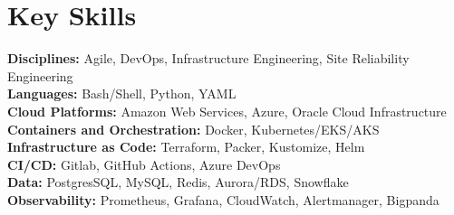 \documentclass[letterpaper,10.5pt]{article}
\makeatletter
\newcommand{\resumeItem}[1]{
  \item\small{
    {#1 \vspace{-2pt}}
  }
}
\newcommand{\resumeProjectHeading}[2]{
    \vspace{-2pt}\item
    \begin{tabular*}{0.97\textwidth}{l@{\extracolsep{\fill}}r}
      \small#1 & #2 \\
    \end{tabular*}\vspace{-7pt}
}
\newcommand{\resumeSubHeadingListStart}{\begin{itemize}[leftmargin=0.15in, label={}]}
\newcommand{\resumeSubHeadingListEnd}{\end{itemize}}
\newcommand{\resumeItemListStart}{\begin{itemize}}
\newcommand{\resumeItemListEnd}{\end{itemize}\vspace{-5pt}}
\makeatother
\begin{document}
\section{Key Skills}
  \vspace{2pt}
  \resumeSubHeadingListStart
    \small{\item{
        \textbf{Disciplines:}{ Agile, DevOps, Infrastructure Engineering, Site Reliability Engineering} \\ \vspace{3pt}
        \textbf{Languages:}{ Bash/Shell, Python, YAML} \\ \vspace{3pt}
        \textbf{Cloud Platforms:}{ Amazon Web Services, Azure, Oracle Cloud Infrastructure} \\ \vspace{3pt}
        \textbf{Containers and Orchestration:}{ Docker, Kubernetes/EKS/AKS } \\ \vspace{3pt}
        \textbf{Infrastructure as Code:}{ Terraform, Packer, Kustomize, Helm} \\ \vspace{3pt}
        \textbf{CI/CD:}{ Gitlab, GitHub Actions, Azure DevOps} \\ \vspace{3pt}
        \textbf{Data:}{ PostgresSQL, MySQL, Redis, Aurora/RDS, Snowflake} \\ \vspace{3pt}   
        \textbf{Observability:}{ Prometheus, Grafana, CloudWatch, Alertmanager, Bigpanda} \\ \vspace{3pt}
    }}
  \resumeSubHeadingListEnd



      
           
\end{document}
